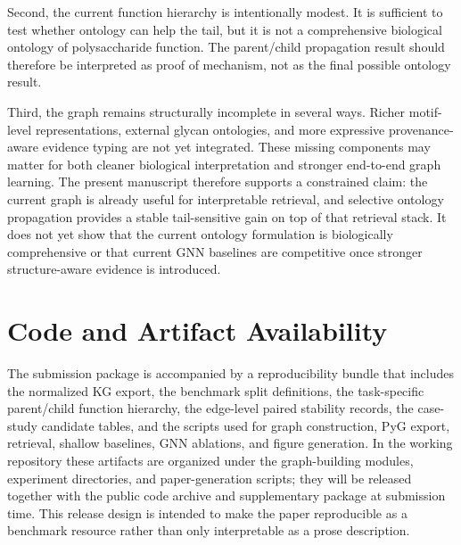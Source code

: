 \documentclass[11pt]{article}
\begin{document}
Second, the current function hierarchy is intentionally modest. It is sufficient to test whether ontology can help the tail, but it is not a comprehensive biological ontology of polysaccharide function. The parent/child propagation result should therefore be interpreted as proof of mechanism, not as the final possible ontology result.

Third, the graph remains structurally incomplete in several ways. Richer motif-level representations, external glycan ontologies, and more expressive provenance-aware evidence typing are not yet integrated. These missing components may matter for both cleaner biological interpretation and stronger end-to-end graph learning. The present manuscript therefore supports a constrained claim: the current graph is already useful for interpretable retrieval, and selective ontology propagation provides a stable tail-sensitive gain on top of that retrieval stack. It does not yet show that the current ontology formulation is biologically comprehensive or that current GNN baselines are competitive once stronger structure-aware evidence is introduced.

\section{Code and Artifact Availability}
\label{sec:artifact-availability}

The submission package is accompanied by a reproducibility bundle that includes the normalized KG export, the benchmark split definitions, the task-specific parent/child function hierarchy, the edge-level paired stability records, the case-study candidate tables, and the scripts used for graph construction, PyG export, retrieval, shallow baselines, GNN ablations, and figure generation. In the working repository these artifacts are organized under the graph-building modules, experiment directories, and paper-generation scripts; they will be released together with the public code archive and supplementary package at submission time. This release design is intended to make the paper reproducible as a benchmark resource rather than only interpretable as a prose description.
\end{document}
